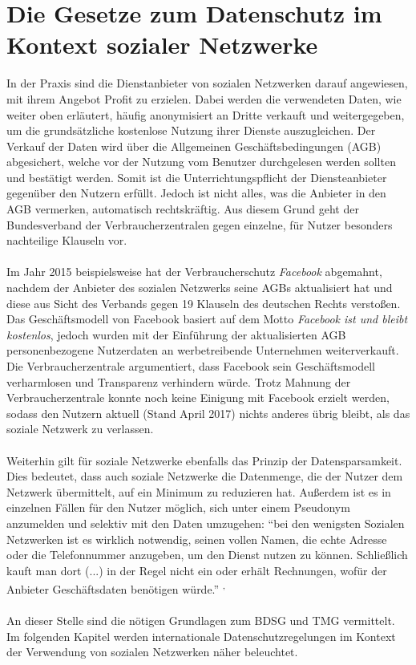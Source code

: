 \section{Die Gesetze zum Datenschutz im Kontext sozialer Netzwerke}
\label{KontextSozialeNetzwerke}
In der Praxis sind die Dienstanbieter von sozialen Netzwerken darauf angewiesen, mit ihrem Angebot Profit zu erzielen. Dabei werden die verwendeten Daten, wie weiter oben erläutert, häufig anonymisiert an Dritte verkauft und weitergegeben, um die grundsätzliche kostenlose Nutzung ihrer Dienste auszugleichen. Der Verkauf der Daten wird über die Allgemeinen Geschäftsbedingungen (\acs{AGB}) abgesichert, welche vor der Nutzung vom Benutzer durchgelesen werden sollten und bestätigt werden. Somit ist die Unterrichtungspflicht der Diensteanbieter gegenüber den Nutzern erfüllt. Jedoch ist nicht alles, was die Anbieter in den AGB vermerken, automatisch rechtskräftig. Aus diesem Grund geht der Bundesverband der Verbraucherzentralen gegen einzelne, für Nutzer besonders nachteilige Klauseln vor.\autocite[vgl.][]{klicksafe.de2}\\
\\Im Jahr 2015 beispielsweise hat der Verbraucherschutz \textit{Facebook} abgemahnt, nachdem der Anbieter des sozialen Netzwerks seine AGBs aktualisiert hat und diese aus Sicht des Verbands gegen 19 Klauseln des deutschen Rechts verstoßen. Das Geschäftsmodell von Facebook basiert auf dem Motto \textit{Facebook ist und bleibt kostenlos}, jedoch wurden mit der Einführung der aktualisierten AGB personenbezogene Nutzerdaten an werbetreibende Unternehmen weiterverkauft. Die Verbraucherzentrale argumentiert, dass Facebook sein Geschäftsmodell verharmlosen und Transparenz verhindern würde. Trotz Mahnung der Verbraucherzentrale konnte noch keine Einigung mit Facebook erzielt werden, sodass den Nutzern aktuell (Stand April 2017) nichts anderes übrig bleibt, als das soziale Netzwerk zu verlassen.\autocite[vgl.][]{SpiegelOnline} \autocite[vgl.][]{Verbraucherzentrale}\\
\\Weiterhin gilt für soziale Netzwerke ebenfalls das Prinzip der Datensparsamkeit. Dies bedeutet, dass auch soziale Netzwerke die Datenmenge, die der Nutzer dem Netzwerk übermittelt, auf ein Minimum zu reduzieren hat. Außerdem ist es in einzelnen Fällen für den Nutzer möglich, sich unter einem Pseudonym anzumelden und selektiv mit den Daten umzugehen: "`bei den wenigsten Sozialen Netzwerken ist es wirklich notwendig, seinen vollen Namen, die echte Adresse oder die Telefonnummer anzugeben, um den Dienst nutzen zu können. Schließlich kauft man dort (...) in der Regel nicht ein oder erhält Rechnungen, wofür der Anbieter Geschäftsdaten benötigen würde."' \textsuperscript{ }\autocite[][]{klicksafe.de2}\textsuperscript{,} \autocite[vgl.][]{klicksafe.de2}\\
\\An dieser Stelle sind die nötigen Grundlagen zum BDSG und TMG vermittelt. Im folgenden Kapitel werden internationale Datenschutzregelungen im Kontext der Verwendung von sozialen Netzwerken näher beleuchtet.